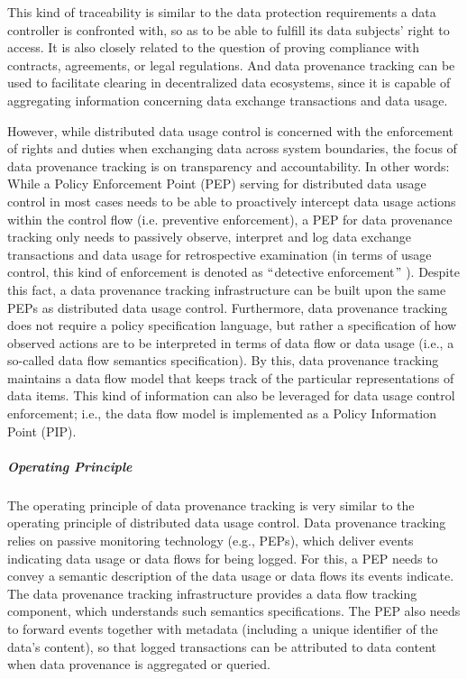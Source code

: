 This kind of traceability is similar to the data protection requirements a data controller is confronted with, so as to be able to fulfill its data subjects’ right to access. It is also closely related to the question of proving compliance with contracts, agreements, or legal regulations. And data provenance tracking can be used to facilitate clearing in decentralized data ecosystems, since it is capable of aggregating information concerning data exchange transactions and data usage.

However, while distributed data usage control is concerned with the enforcement of rights and duties when exchanging data across system boundaries, the focus of data provenance tracking is on transparency and accountability. In other words: While a Policy Enforcement Point (PEP) serving for distributed data usage control in most cases needs to be able to proactively intercept data usage actions within the control flow (i.e. preventive enforcement), a PEP for data provenance tracking only needs to passively observe, interpret and log data exchange transactions and data usage for retrospective examination (in terms of usage control, this kind of enforcement is denoted as $``$detective enforcement$"$ ). Despite this fact, a data provenance tracking infrastructure can be built upon the same PEPs as distributed data usage control. Furthermore, data provenance tracking does not require a policy specification language, but rather a specification of how observed actions are to be interpreted in terms of data flow or data usage (i.e., a so-called data flow semantics specification). By this, data provenance tracking maintains a data flow model that keeps track of the particular representations of data items. This kind of information can also be leveraged for data usage control enforcement; i.e., the data flow model is implemented as a Policy Information Point (PIP).


\subparagraph*{Operating Principle \\}
The operating principle of data provenance tracking is very similar to the operating principle of distributed data usage control. Data provenance tracking relies on passive monitoring technology (e.g., PEPs), which deliver events indicating data usage or data flows for being logged. For this, a PEP needs to convey a semantic description of the data usage or data flows its events indicate. The data provenance tracking infrastructure provides a data flow tracking component, which understands such semantics specifications. The PEP also needs to forward events together with metadata (including a unique identifier of the data’s content), so that logged transactions can be attributed to data content when data provenance is aggregated or queried.


